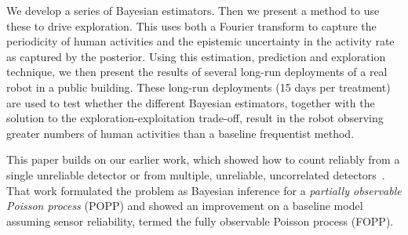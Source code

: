 We develop a series of Bayesian estimators. Then we present a method to use these to drive exploration. This uses both a Fourier transform to capture the periodicity of human activities and the epistemic uncertainty in the activity rate as captured by the posterior. Using this estimation, prediction and exploration technique, we then present the results of several long-run deployments of a real robot in a public building. These long-run deployments (15 days per treatment) are used to test whether the different Bayesian estimators, together with the solution to the exploration-exploitation trade-off, result in the robot observing greater numbers of human activities than a baseline frequentist method.

This paper builds on our earlier work, which showed how to count reliably from a single unreliable detector or from multiple, unreliable, uncorrelated detectors~\cite{jovan18a}. That work formulated the problem as Bayesian inference for a \textit{partially observable Poisson process} (POPP) and showed an improvement on a baseline model assuming sensor reliability, termed the fully observable Poisson process (FOPP).

